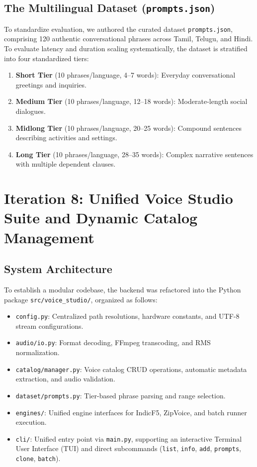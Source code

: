 \subsection{The Multilingual Dataset (\texttt{prompts.json})}
To standardize evaluation, we authored the curated dataset \texttt{prompts.json}, comprising 120 authentic conversational phrases across Tamil, Telugu, and Hindi. To evaluate latency and duration scaling systematically, the dataset is stratified into four standardized tiers:
\begin{enumerate}
    \item \textbf{Short Tier} (10 phrases/language, 4--7 words): Everyday conversational greetings and inquiries.
    \item \textbf{Medium Tier} (10 phrases/language, 12--18 words): Moderate-length social dialogues.
    \item \textbf{Midlong Tier} (10 phrases/language, 20--25 words): Compound sentences describing activities and settings.
    \item \textbf{Long Tier} (10 phrases/language, 28--35 words): Complex narrative sentences with multiple dependent clauses.
\end{enumerate}

\section{Iteration 8: Unified Voice Studio Suite and Dynamic Catalog Management}
\subsection{System Architecture}
To establish a modular codebase, the backend was refactored into the Python package \texttt{src/voice\_studio/}, organized as follows:
\begin{itemize}
    \item \texttt{config.py}: Centralized path resolutions, hardware constants, and UTF-8 stream configurations.
    \item \texttt{audio/io.py}: Format decoding, FFmpeg transcoding, and RMS normalization.
    \item \texttt{catalog/manager.py}: Voice catalog CRUD operations, automatic metadata extraction, and audio validation.
    \item \texttt{dataset/prompts.py}: Tier-based phrase parsing and range selection.
    \item \texttt{engines/}: Unified engine interfaces for IndicF5, ZipVoice, and batch runner execution.
    \item \texttt{cli/}: Unified entry point via \texttt{main.py}, supporting an interactive Terminal User Interface (TUI) and direct subcommands (\texttt{list}, \texttt{info}, \texttt{add}, \texttt{prompts}, \texttt{clone}, \texttt{batch}).
\end{itemize}

